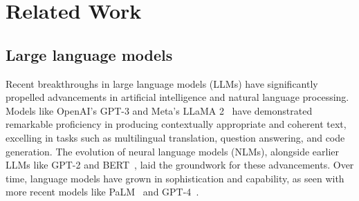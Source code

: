 \section{Related Work}
\label{sec:Background}
\subsection{Large language models}
Recent breakthroughs in large language models (LLMs) have significantly propelled advancements in artificial intelligence and natural language processing. Models like OpenAI's GPT-3 and Meta's LLaMA 2~\cite{touvron2023llama} have demonstrated remarkable proficiency in producing contextually appropriate and coherent text, excelling in tasks such as multilingual translation, question answering, and code generation.
The evolution of neural language models (NLMs)\cite{arisoy2012deep}, alongside earlier LLMs like GPT-2\cite{radford2019language} and BERT~\cite{devlin2018bert}, laid the groundwork for these advancements. Over time, language models have grown in sophistication and capability, as seen with more recent models like PaLM~\cite{chowdhery2023palm} and GPT-4~\cite{achiam2023gpt}.

